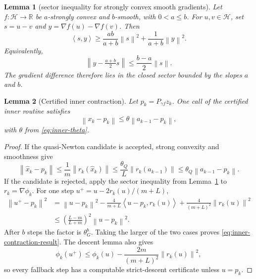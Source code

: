 \documentclass[10pt,a4paper]{amsart}
\newtheorem{lemma}{Lemma}
\newcommand{\Hcal}{\mathcal{H}}
\newcommand{\R}{\mathbb{R}}
\newcommand{\grad}{\nabla}
\newcommand{\ip}[2]{\left\langle #1,#2 \right\rangle}
\newcommand{\norm}[1]{\left\lVert #1 \right\rVert}
\begin{document}
\begin{lemma}[sector inequality for strongly convex smooth gradients]
\label{lem:sector}
Let $f:\Hcal\to\R$ be $a$-strongly convex and $b$-smooth, with
$0<a\le b$.  For $u,v\in\Hcal$, set
$s=u-v$ and $y=\grad f(u)-\grad f(v)$.  Then
\begin{equation}
\label{eq:sector-ineq}
  \ip{s}{y}
  \ge
  \frac{ab}{a+b}\norm{s}^2
  +\frac{1}{a+b}\norm{y}^2.
\end{equation}
Equivalently,
\begin{equation}
\label{eq:sector-ball-form}
  \norm{y-\tfrac{a+b}{2}s}
  \le\frac{b-a}{2}\norm{s}.
\end{equation}
The gradient difference therefore lies in the closed sector bounded by the slopes $a$ and $b$.
\end{lemma}

\begin{lemma}[Certified inner contraction]
\label{lem:certified-inner-contraction}
Let $p_k=P_{\gamma f}z_k$.  One call of the certified inner routine satisfies
\begin{equation}
\label{eq:inner-contraction-result}
    \norm{x_k-p_k}
    \le\theta\norm{a_{k-1}-p_k},
\end{equation}
with $\theta$ from \eqref{eq:inner-theta}.
\end{lemma}

\begin{proof}
If the quasi-Newton candidate is accepted, strong convexity and smoothness give
\[
    \norm{\widehat x_k-p_k}
    \le\frac1m\norm{r_k(\widehat x_k)}
    \le\frac{\theta_Q}{L}\norm{r_k(a_{k-1})}
    \le\theta_Q\norm{a_{k-1}-p_k}.
\]
If the candidate is rejected, apply the sector inequality from Lemma~\ref{lem:sector} to $r_k=\grad\phi_k$.  For one step $u^+=u-2r_k(u)/(m+L)$,
\[
\begin{aligned}
    \norm{u^+-p_k}^2
    &=\norm{u-p_k}^2
      -\frac{4}{m+L}\ip{u-p_k}{r_k(u)}
      +\frac{4}{(m+L)^2}\norm{r_k(u)}^2\\
    &\le\left(\frac{L-m}{L+m}\right)^2\norm{u-p_k}^2.
\end{aligned}
\]
After $b$ steps the factor is $\theta_G^b$.  Taking the larger of the two cases proves \eqref{eq:inner-contraction-result}.  The descent lemma also gives
\[
    \phi_k(u^+)\le\phi_k(u)
       -\frac{2m}{(m+L)^2}\norm{r_k(u)}^2,
\]
so every fallback step has a computable strict-descent certificate unless $u=p_k$.
\end{proof}
\end{document}
